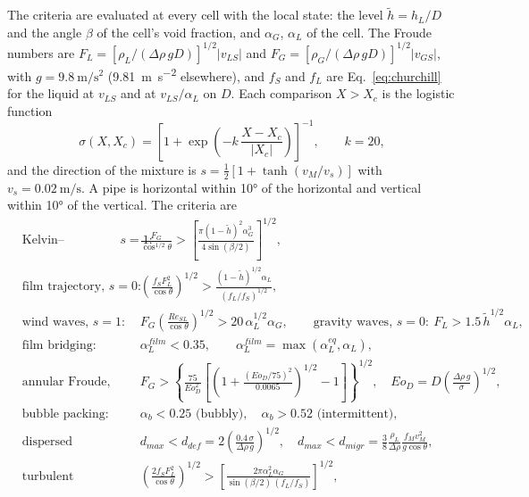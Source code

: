\documentclass[a4paper,fleqn]{cas-sc}
\newcommand{\aG}{\alpha_G}
\newcommand{\aL}{\alpha_L}
\begin{document}
The criteria are evaluated at every cell with the local state: the level $\tilde h = h_L/D$ and the angle $\beta$ of the cell's void fraction, and $\aG$, $\aL$ of the cell. The Froude numbers are $F_L = [\rho_L/(\Delta\rho\,g D)]^{1/2}|v_{LS}|$ and $F_G = [\rho_G/(\Delta\rho\,g D)]^{1/2}|v_{GS}|$, with $g = \SI{9.8}{\metre\per\square\second}$ (\SI{9.81}{\metre\per\square\second} elsewhere), and $f_S$ and $f_L$ are Eq.~\eqref{eq:churchill} for the liquid at $v_{LS}$ and at $v_{LS}/\aL$ on $D$. Each comparison $X > X_c$ is the logistic function
\begin{equation}
\sigma(X, X_c) = \left[1 + \exp\left(-k\,\frac{X - X_c}{|X_c|}\right)\right]^{-1}, \qquad k = 20,
\end{equation}
and the direction of the mixture is $s = \tfrac12[1 + \tanh(v_M/v_s)]$ with $v_s = \SI{0.02}{\metre\per\second}$. A pipe is horizontal within \ang{10} of the horizontal and vertical within \ang{10} of the vertical. The criteria are
\begin{align}
&\text{Kelvin--Helmholtz, } s = 1: && \frac{F_G}{\cos^{1/2}\theta} > \left[\frac{\pi(1 - \tilde h)^2\aG^3}{4\sin(\beta/2)}\right]^{1/2}, \label{eq:kh}\\
&\text{film trajectory, } s = 0: && \left(\frac{f_S F_L^2}{\cos\theta}\right)^{1/2} > \frac{(1 - \tilde h)^{1/2}\aL}{(f_L/f_S)^{1/2}},\\
&\text{wind waves, } s = 1: && F_G\left(\frac{Re_{SL}}{\cos\theta}\right)^{1/2} > 20\,\aL^{1/2}\aG, \qquad\text{gravity waves, } s = 0:\ F_L > 1.5\,\tilde h^{1/2}\aL,\\
&\text{film bridging:} && \aL^{film} < 0.35, \qquad \aL^{film} = \max(\aL^{eq}, \aL),\\
&\text{annular Froude, vertical:} && F_G > \left\{\frac{75}{Eo_D^2}\left[\left(1 + \frac{(Eo_D/75)^2}{0.0065}\right)^{1/2} - 1\right]\right\}^{1/2}, \quad Eo_D = D\left(\frac{\Delta\rho\,g}{\sigma}\right)^{1/2},\\
&\text{bubble packing:} && \alpha_b < 0.25 \text{ (bubbly)}, \quad \alpha_b > 0.52 \text{ (intermittent)},\\
&\text{dispersed bubbles:} && d_{max} < d_{def} = 2\left(\frac{0.4\,\sigma}{\Delta\rho\,g}\right)^{1/2}, \quad d_{max} < d_{migr} = \frac38\frac{\rho_L}{\Delta\rho}\frac{f_M v_M^2}{g\cos\theta},\\
&\text{turbulent dispersion, horizontal:} && \left(\frac{2 f_S F_L^2}{\cos\theta}\right)^{1/2} > \left[\frac{2\pi\aL^2\aG}{\sin(\beta/2)\,(f_L/f_S)}\right]^{1/2},
\end{align}
\end{document}
